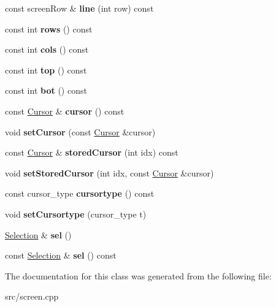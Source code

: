 \begin{DoxyCompactItemize}
\item 
\mbox{\label{classScreenImpl_aa41e5883bfc0c26b63deaf6f2399e7bf}} 
const screen\+Row \& {\bfseries line} (int row) const
\item 
\mbox{\label{classScreenImpl_a852cf32e6512b7a4bbf03f681bbe9bab}} 
const int {\bfseries rows} () const
\item 
\mbox{\label{classScreenImpl_a50b6e7ff9b6a9bd8e1cbf83f5bf43753}} 
const int {\bfseries cols} () const
\item 
\mbox{\label{classScreenImpl_a8a0aede4f8aa4e49d71f311fbd9a4263}} 
const int {\bfseries top} () const
\item 
\mbox{\label{classScreenImpl_ac3011651bde2b3adbc1ce57057ce0bc2}} 
const int {\bfseries bot} () const
\item 
\mbox{\label{classScreenImpl_a6b71bad089111ec43141f21e680068dc}} 
const \mbox{\hyperlink{structCursor}{Cursor}} \& {\bfseries cursor} () const
\item 
\mbox{\label{classScreenImpl_a1770c8b4d7e164eb7faf59e5e6d762fa}} 
void {\bfseries set\+Cursor} (const \mbox{\hyperlink{structCursor}{Cursor}} \&cursor)
\item 
\mbox{\label{classScreenImpl_a6973aab75481b0cc0fe49c436ee97be0}} 
const \mbox{\hyperlink{structCursor}{Cursor}} \& {\bfseries stored\+Cursor} (int idx) const
\item 
\mbox{\label{classScreenImpl_aeecd0c7fb82896eb98c39482d8c08513}} 
void {\bfseries set\+Stored\+Cursor} (int idx, const \mbox{\hyperlink{structCursor}{Cursor}} \&cursor)
\item 
\mbox{\label{classScreenImpl_a318cd723d42d5339b3bc1d696b58e494}} 
const cursor\+\_\+type {\bfseries cursortype} () const
\item 
\mbox{\label{classScreenImpl_ae52d425de01454c7ae34b5b80fb6eb4b}} 
void {\bfseries set\+Cursortype} (cursor\+\_\+type t)
\item 
\mbox{\label{classScreenImpl_a8cf4f55f69d51c68369c109751427717}} 
\mbox{\hyperlink{classSelection}{Selection}} \& {\bfseries sel} ()
\item 
\mbox{\label{classScreenImpl_acde4e0bb15bb058cd4c0348d2b173b1b}} 
const \mbox{\hyperlink{classSelection}{Selection}} \& {\bfseries sel} () const
\end{DoxyCompactItemize}


The documentation for this class was generated from the following file\+:\begin{DoxyCompactItemize}
\item 
src/screen.\+cpp\end{DoxyCompactItemize}
